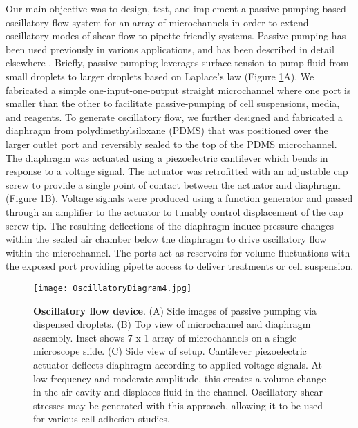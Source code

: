 Our main objective was to design, test, and implement a passive-pumping-based oscillatory flow system for an array of microchannels in order to extend oscillatory modes of shear flow to pipette friendly systems.  Passive-pumping has been used previously in various applications, and has been described in detail elsewhere \cite{Berthier:2007mi,Meyvantsson:2008,Walker:2004ov}. Briefly, passive-pumping leverages surface tension to pump fluid from small droplets to larger droplets based on Laplace's law (Figure \ref{figure:schematic}A). We fabricated a simple one-input-one-output straight microchannel where one port is smaller than the other to facilitate passive-pumping of cell suspensions, media, and reagents. To generate oscillatory flow, we further designed and fabricated a diaphragm from polydimethylsiloxane (PDMS) that was positioned over the larger outlet port and reversibly sealed to the top of the PDMS microchannel. The diaphragm was actuated using a piezoelectric cantilever which bends in response to a voltage signal. The actuator was retrofitted with an adjustable cap screw to provide a single point of contact between the actuator and diaphragm (Figure \ref{figure:schematic}B). Voltage signals were produced using a function generator and passed through an amplifier to the actuator to tunably control displacement of the cap screw tip. The resulting deflections of the diaphragm induce pressure changes within the sealed air chamber below the diaphragm to drive oscillatory flow within the microchannel. The ports act as reservoirs for volume fluctuations with the exposed port providing pipette access to deliver treatments or cell suspension.

\begin{figure}[ht] %
\centering
\texttt{[image: OscillatoryDiagram4.jpg]}
\caption{\textbf{Oscillatory flow device}. (A) Side images of passive pumping via dispensed droplets. (B) Top view of microchannel and diaphragm assembly. Inset shows 7 x 1 array of microchannels on a single microscope slide. (C) Side view of setup. Cantilever piezoelectric actuator deflects diaphragm according to applied voltage signals. At low frequency and moderate amplitude, this creates a volume change in the air cavity and displaces fluid in the channel. Oscillatory shear-stresses may be generated with this approach, allowing it to be used for various cell adhesion studies.}
\label{figure:schematic}
\end{figure}


